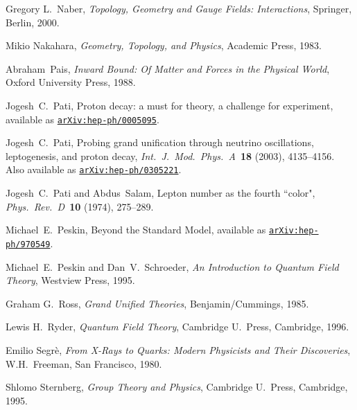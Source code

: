 \documentclass{article}
\begin{document}
\begin{thebibliography}{99}
Gregory L.\ Naber, {\em{Topology, Geometry and Gauge Fields: Interactions}}, 
Springer, Berlin, 2000.

Mikio Nakahara, {\em {Geometry, Topology, and Physics}}, Academic Press,
1983.


Abraham\ Pais, {\em {Inward Bound: Of Matter and Forces in the Physical World}},
Oxford University Press, 1988.

Jogesh\ C.\ Pati, Proton decay: a must for theory, a challenge for experiment,
available as
\href{http://arxiv.org/abs/hep-ph/0005095}{\texttt{arXiv:hep-ph/0005095}}. 

Jogesh\ C.\ Pati, Probing grand unification through neutrino oscillations,
leptogenesis, and proton decay, {\em {Int.\ J.\ Mod.\ Phys.\ A\ }}{\bf 18}
(2003), 4135--4156. Also available as
\href{http://arxiv.org/abs/hep-ph/0305221}{\texttt{arXiv:hep-ph/0305221}}.  

Jogesh\ C.\ Pati and Abdus\ Salam, Lepton number as the fourth ``color", {\em
{Phys.\ Rev.\ D\ }}{\bf 10} (1974), 275--289.

Michael\ E.\ Peskin, Beyond the Standard Model, available as 
\href{http://arxiv.org/abs/hep-ph/970549}{\texttt{arXiv:hep-ph/970549}}.

Michael\ E.\ Peskin and Dan\ V.\ Schroeder, {\em {An Introduction to Quantum
Field Theory}}, Westview Press, 1995.

Graham G.\ Ross, {\em {Grand Unified Theories}}, Benjamin/Cummings, 1985.

Lewis H.\ Ryder, {\em {Quantum Field Theory}}, Cambridge U.\ Press, Cambridge,
1996.

Emilio Segr{\`e}, {\em {From X-Rays to Quarks: Modern Physicists and Their
Discoveries}}, W.H.\ Freeman, San Francisco, 1980.

 Shlomo Sternberg, {\em {Group Theory and Physics}},
Cambridge U.\ Press, Cambridge, 1995.


\end{thebibliography}
\end{document}
